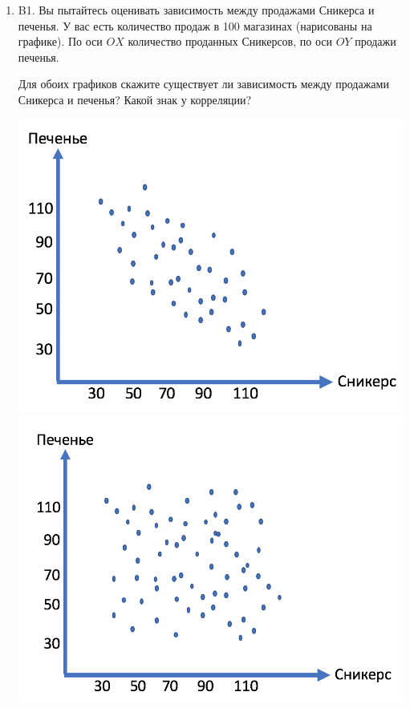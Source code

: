 \documentclass[12pt]{article}
\newenvironment{problem}{}{}
\begin{document}
\begin{enumerate}
\begin{problem}
\item[B1.]  Вы пытайтесь оценивать зависимость между продажами Сникерса и печенья. У вас есть количество продаж в 100 магазинах (нарисованы на графике). По оси $OX$ количество проданных Сникерсов, по оси $OY$ продажи печенья. 

Для обоих графиков скажите существует ли зависимость между продажами Сникерса и печенья? Какой знак у корреляции? 

\includegraphics[scale=0.5]{negative_correlation}\includegraphics[scale=0.5]{Independent}


\end{problem}
\end{enumerate}
\end{document}
